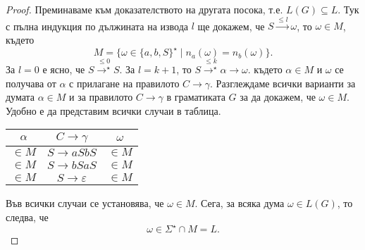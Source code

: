 \begin{proof}
  Преминаваме към доказателството на другата посока, т.е. $L(G) \subseteq L$.
  Тук с пълна индукция по дължината на извода $l$ ще докажем, че $S \stackrel{\leq l}{\rightarrow} \omega$, то $\omega \in M$,
  където
  \[M = \{\omega \in \{a,b,S\}^\star \mid n_a(\omega) = n_b(\omega)\}.\]
  За $l = 0$  е ясно, че $S \stackrel{\leq 0}{\rightarrow^\star} S$.
  За $l = k+1$, то $S \stackrel{\leq k}{\rightarrow^\star} \alpha \rightarrow \omega$.
  където $\alpha \in M$ и $\omega$ се получава от $\alpha$ с прилагане на правилото $C \rightarrow \gamma$.
  Разглеждаме всички варианти за думата $\alpha \in M$ и за правилото $C\rightarrow \gamma$ в граматиката $G$
  за да докажем, че  $\omega \in M$.
  Удобно е да представим всички случаи в таблица.
  \begin{center}
    \begin{tabular}{| c | c | c |}
      \hline
      $\alpha$ & $C \rightarrow \gamma$ & $\omega$ \\ \hline
      $\in M$ & $S \rightarrow aSbS$ & $\in M$ \\ \hline
      $\in M$ & $S \rightarrow bSaS$ & $\in M$ \\ \hline
      $\in M$ & $S \rightarrow \varepsilon$ & $\in M$ \\ \hline
    \end{tabular}
  \end{center}
  Във всички случаи се установява, че $\omega \in M$.
  Сега, за всяка дума $\omega \in L(G)$, то следва, че
  \[\omega \in \Sigma^\star \cap M = L.\]
\end{proof}

